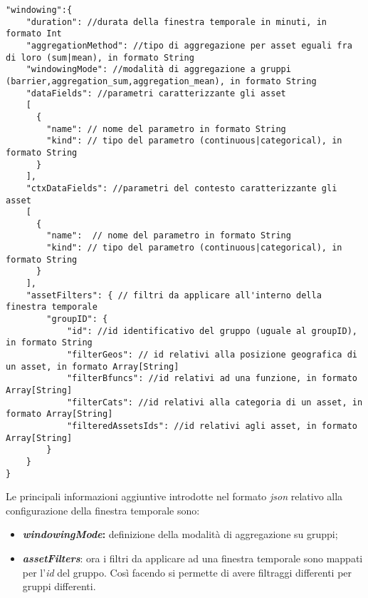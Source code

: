 \begin{verbatim}
"windowing":{
    "duration": //durata della finestra temporale in minuti, in formato Int
    "aggregationMethod": //tipo di aggregazione per asset eguali fra di loro (sum|mean), in formato String
    "windowingMode": //modalità di aggregazione a gruppi (barrier,aggregation_sum,aggregation_mean), in formato String
    "dataFields": //parametri caratterizzante gli asset
    [
      {
        "name": // nome del parametro in formato String
        "kind": // tipo del parametro (continuous|categorical), in formato String
      }
    ],
    "ctxDataFields": //parametri del contesto caratterizzante gli asset 
    [
      {
        "name":  // nome del parametro in formato String
        "kind": // tipo del parametro (continuous|categorical), in formato String
      }
    ],
    "assetFilters": { // filtri da applicare all'interno della finestra temporale
        "groupID": {
            "id": //id identificativo del gruppo (uguale al groupID), in formato String
            "filterGeos": // id relativi alla posizione geografica di un asset, in formato Array[String]
            "filterBfuncs": //id relativi ad una funzione, in formato Array[String]
            "filterCats": //id relativi alla categoria di un asset, in formato Array[String]
            "filteredAssetsIds": //id relativi agli asset, in formato Array[String]
        } 
    }
}
\end{verbatim}
Le principali informazioni aggiuntive introdotte nel formato \textit{\gls{json}} relativo alla configurazione della finestra temporale sono:
\begin{itemize}
	\item{\textbf{\textit{windowingMode}:} definizione della modalità di aggregazione su gruppi;}
	\item{\textbf{\textit{assetFilters}}: ora i filtri da applicare ad una finestra temporale sono mappati per l'\textit{id} del gruppo. Così facendo si permette di avere filtraggi differenti per gruppi differenti.}
\end{itemize} 


